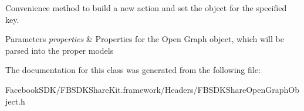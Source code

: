 Convenience method to build a new action and set the object for the specified key. 
\begin{DoxyParams}{Parameters}
{\em properties} & Properties for the Open Graph object, which will be parsed into the proper models \\
\hline
\end{DoxyParams}


The documentation for this class was generated from the following file\-:\begin{DoxyCompactItemize}
\item 
Facebook\-S\-D\-K/\-F\-B\-S\-D\-K\-Share\-Kit.\-framework/\-Headers/F\-B\-S\-D\-K\-Share\-Open\-Graph\-Object.\-h\end{DoxyCompactItemize}
